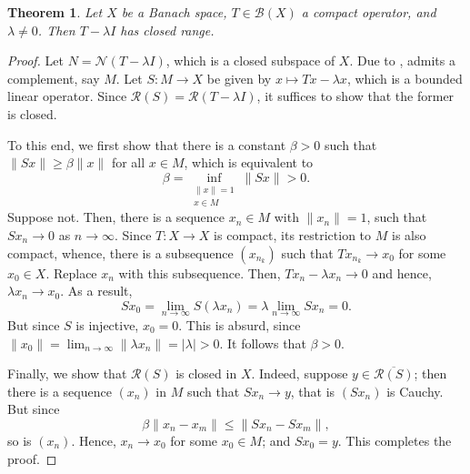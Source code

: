 \documentclass[12pt]{article}
\theoremstyle{thmstyle}
\newtheorem{theorem}{Theorem}[section]
\theoremstyle{defstyle}
\newcommand{\scrB}{\mathscr B}
\newcommand{\scrN}{\mathscr N}
\newcommand{\scrR}{\mathscr R}
\renewcommand{\le}{\leqslant}
\renewcommand{\ge}{\geqslant}
\begin{document}
\begin{theorem}
    Let $X$ be a Banach space, $T\in\scrB(X)$ a compact operator, and $\lambda\ne 0$. Then $T - \lambda I$ has closed range.
\end{theorem}
\begin{proof}
    Let $N = \scrN(T - \lambda I)$, which is a closed subspace of $X$. Due to , admits a complement, say $M$. Let $S: M\to X$ be given by $x\mapsto Tx - \lambda x$, which is a bounded linear operator. Since $\scrR(S) = \scrR(T - \lambda I)$, it suffices to show that the former is closed. 

    To this end, we first show that there is a constant $\beta > 0$ such that $\|Sx\|\ge\beta\|x\|$ for all $x\in M$, which is equivalent to 
    \begin{equation*}
        \beta = \inf_{\substack{\|x\| = 1\\ x\in M}}\|Sx\| > 0.
    \end{equation*}
    Suppose not. Then, there is a sequence $x_n\in M$ with $\|x_n\| = 1$, such that $Sx_n\to 0$ as $n\to\infty$. Since $T: X\to X$ is compact, its restriction to $M$ is also compact, whence, there is a subsequence $(x_{n_k})$ such that $Tx_{n_k}\to x_0$ for some $x_0\in X$. Replace $x_n$ with this subsequence. Then, $Tx_n - \lambda x_n\to 0$ and hence, $\lambda x_n\to x_0$. As a result, 
    \begin{equation*}
        Sx_0 = \lim_{n\to\infty} S(\lambda x_n) = \lambda\lim_{n\to\infty} Sx_n = 0.
    \end{equation*}
    But since $S$ is injective, $x_0 = 0$. This is absurd, since $\|x_0\| = \lim_{n\to\infty}\|\lambda x_n\| = |\lambda| > 0$. It follows that $\beta > 0$.

    Finally, we show that $\scrR(S)$ is closed in $X$. Indeed, suppose $y\in\overline{\scrR(S)}$; then there is a sequence $(x_n)$ in $M$ such that $Sx_n\to y$, that is $(Sx_n)$ is Cauchy. But since 
    \begin{equation*}
        \beta\|x_n - x_m\|\le\|Sx_n - Sx_m\|,
    \end{equation*}
    so is $(x_n)$. Hence, $x_n\to x_0$ for some $x_0\in M$; and $Sx_0 = y$. This completes the proof.
\end{proof}
\end{document}
